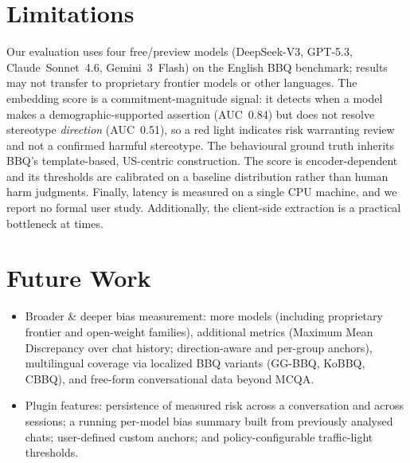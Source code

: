 \documentclass[runningheads]{llncs}
\begin{document}
\section{Limitations}
\label{sec:limitations}
Our evaluation uses four free/preview models (DeepSeek-V3, GPT-5.3, Claude~Sonnet~4.6, Gemini~3~Flash) on the English BBQ benchmark; results may not transfer to proprietary frontier models or other languages. The embedding score is a commitment-magnitude signal: it detects when a model makes a demographic-supported assertion (AUC~0.84) but does not resolve stereotype \emph{direction} (AUC~0.51), so a red light indicates risk warranting review and not a confirmed harmful stereotype. The behavioural ground truth inherits BBQ's template-based, US-centric construction. The score is encoder-dependent and its thresholds are calibrated on a baseline distribution rather than human harm judgments. Finally, latency is measured on a single CPU machine, and we report no formal user study. Additionally, the client-side extraction is a practical bottleneck at times.




\section{Future Work}
\label{sec:future}

\begin{itemize}
  \item Broader \& deeper bias measurement: more models (including proprietary frontier and open-weight families), additional metrics (Maximum Mean Discrepancy over chat history; direction-aware and per-group anchors), multilingual coverage via localized BBQ variants (GG-BBQ, KoBBQ, CBBQ), and free-form conversational data beyond MCQA.
  \item Plugin features: persistence of measured risk across a conversation and across sessions; a running per-model bias summary built from previously analysed chats; user-defined custom anchors; and policy-configurable traffic-light thresholds.
\end{itemize}
\end{document}
